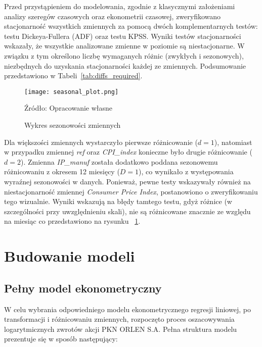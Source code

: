 \documentclass[12pt, twoside]{article}
\begin{document}
Przed przystąpieniem do modelowania, zgodnie z klasycznymi założeniami analizy szeregów czasowych oraz ekonometrii czasowej, zweryfikowano stacjonarność wszystkich zmiennych za pomocą dwóch komplementarnych testów: testu Dickeya-Fullera (ADF) oraz testu KPSS. Wyniki testów stacjonarności wskazały, że wszystkie analizowane zmienne w poziomie są niestacjonarne. W związku z tym określono liczbę wymaganych różnic (zwykłych i sezonowych), niezbędnych do uzyskania stacjonarności każdej ze zmiennych. Podsumowanie przedstawiono w Tabeli~\ref{tab:diffs_required}.

\begin{figure}[H]
    \centering
    \texttt{[image: seasonal\_plot.png]}
    \caption{Wykres sezonowości zmiennych}
    \label{fig:seasonal}
    \vspace{0.1cm}
    {\parbox[t]{\linewidth}{\raggedright Źródło: Opracowanie własne}}

\end{figure}


Dla większości zmiennych wystarczyło pierwsze różnicowanie ($d = 1$), natomiast w przypadku zmiennej \textit{ref} oraz \textit{CPI\_index} konieczne było drugie różnicowanie ($d = 2$). Zmienna \textit{IP\_manuf} została dodatkowo poddana sezonowemu różnicowaniu z okresem 12 miesięcy ($D = 1$), co wynikało z występowania wyraźnej sezonowości w danych. Ponieważ, pewne testy wskazywały również na niestacjonarność zmiennej \textit{Consumer Price Index}, postanowiono o zweryfikowaniu tego wizualnie. Wyniki wskazują na błędy tamtego testu, gdyż różnice (w szczególności przy uwzględnieniu skali), nie są różnicowane znacznie ze względu na miesiąc co przedstawiono na rysunku ~\ref{fig:seasonal}.


\newpage
\section{Budowanie modeli}

\subsection*{Pełny model ekonometryczny}

W celu wybrania odpowiedniego modelu ekonometrycznego regresji liniowej, po transformacji i różnicowaniu zmiennych, rozpoczęto proces oszacowywania logarytmicznych zwrotów akcji PKN ORLEN S.A. Pełna struktura modelu prezentuje się w sposób następujący:
\end{document}
